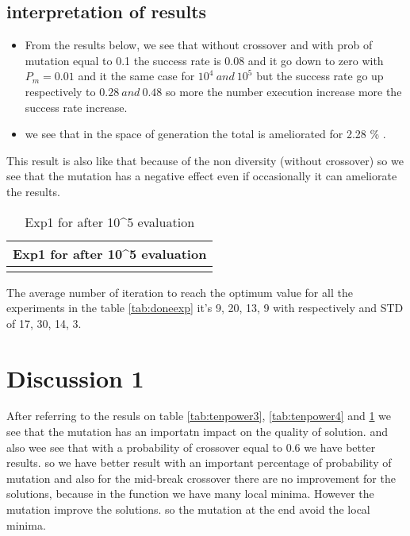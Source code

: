 \subsection{interpretation of results}
\begin{itemize}
\item From the results below, we see that without crossover and with prob of mutation equal to 0.1 the success rate is 0.08 and it go down to zero with $ P_m = 0.01 $ and it the same case for $ 10^4\ and\ 10^5 $ but the success rate go up respectively to $ 0.28\ and\ 0.48 $ so more the number execution increase more the success rate increase.

\item we see that in the space of generation the total is ameliorated for 2.28 \% .
\end{itemize}

This result is also like that because of the  non diversity (without crossover) so we see that the mutation has a negative effect even if occasionally it can ameliorate the results. 


\begin{table}[H]
\centering
\caption{Exp1 for after 10\textasciicircum 5 evaluation}
\vspace{+6mm}
\label{tab:tenpower5}
\begin{tabular}{|c|l|l|c|}
\hline
\multicolumn{4}{|c|}{Exp1 for after 10\textasciicircum 5 evaluation} \\ \hline
 &  &  &  \\ \hline
\end{tabular}
\end{table}

The average number of iteration to reach the optimum value for all the experiments in the table  \ref{tab:doneexp} it's 9, 20, 13, 9 with respectively and STD of 17, 30, 14, 3.


\section{Discussion 1}
After referring to the resuls on table  \ref{tab:tenpower3}, \ref{tab:tenpower4} and \ref{tab:tenpower5} we see that the mutation has an importatn impact on the quality of solution. and also wee see that with a probability of crossover equal to 0.6 we have better results. so we have better result with an important percentage of  probability of mutation and also for the mid-break crossover there are no improvement for the solutions, because in the function we have many local minima.
However the mutation improve the solutions. so the mutation at the end avoid the local minima.



